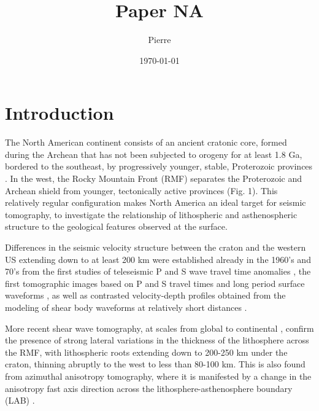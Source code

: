 \documentclass[12pt]{article}
\author{Pierre}
\title{Paper NA}
\date{\today}
\begin{document}
\maketitle

\section{Introduction}

The North American continent consists of an ancient cratonic core, formed during the Archean that has not been subjected to orogeny for at least 1.8 Ga, bordered to the southeast, by progressively younger, stable, Proterozoic provinces \citep{hoffman1988united}. In the west, the Rocky Mountain Front (RMF) separates the Proterozoic and Archean shield from younger, tectonically active provinces (Fig. 1). This relatively regular configuration makes North America an ideal target for seismic tomography, to investigate the relationship of lithospheric and asthenospheric structure to the geological features observed at the surface. 

Differences in the seismic velocity structure between the craton and the western US extending down to at least 200 km were established already in the 1960's and 70's from the first studies of teleseismic P and S wave travel time anomalies  \citep[e.g.][]{cleary1966analysis,herrin1968regional,poupinet1979relation}, the first tomographic images based on P and S travel times \citep{romanowicz1979seismic} and long period surface waveforms \citep{woodhouse1984mapping}, as well as contrasted velocity-depth profiles obtained from the modeling of shear body waveforms at relatively short distances \citep[e.g.][]{grand1984upper}.

More recent shear wave tomography, at scales from global \citep[e.g.][]{su1994degree,megnin2000three,shapiro2002monte,panning2006three,kustowski2008anisotropic,ritsema2010s40rts,lekic2011inferring,debayle2012global,schaeffer2013global} to continental \citep{lee2005surface,yuan20113,yuan2014lithospheric,schaeffer2014imaging}, confirm the presence of strong lateral variations in the thickness of the lithosphere across the RMF, with lithospheric roots extending down to 200-250 km under the craton, thinning abruptly to the west to less than 80-100 km. This is also found from azimuthal anisotropy tomography, where it is manifested by a change in the anisotropy fast axis direction across the lithosphere-asthenosphere boundary (LAB) \citep{marone2007depth,yuan2010lithospheric}.
\end{document}
